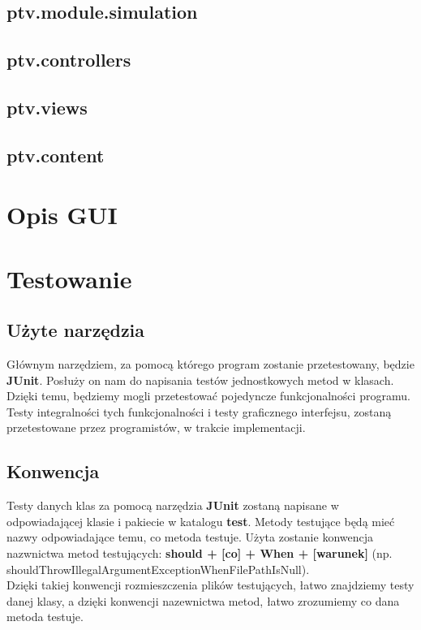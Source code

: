 \documentclass[]{article}
\begin{document}
        \subsection{ptv.module.simulation} %
        \subsection{ptv.controllers} %
        \subsection{ptv.views} %
        \subsection{ptv.content}

    
    \section{Opis GUI} %
    
    
    \section{Testowanie}
        \subsection{Użyte narzędzia}
        Głównym narzędziem, za pomocą którego program zostanie przetestowany, będzie \textbf{JUnit}.
        Posłuży on nam do napisania testów jednostkowych metod w klasach.
        Dzięki temu, będziemy mogli przetestować pojedyncze funkcjonalności programu.\\
        Testy integralności tych funkcjonalności i testy graficznego interfejsu, zostaną przetestowane przez programistów, w trakcie implementacji.
        
        \subsection{Konwencja}
        Testy danych klas za pomocą narzędzia \textbf{JUnit} zostaną napisane w odpowiadającej klasie i pakiecie
        w katalogu \textbf{test}.
        Metody testujące będą mieć nazwy odpowiadające temu, co metoda testuje.
        Użyta zostanie konwencja nazwnictwa metod testujących: \textbf{should + [co] + When + [warunek]}
        (np. shouldThrowIllegalArgumentExceptionWhenFilePathIsNull).\\
        Dzięki takiej konwencji rozmieszczenia plików testujących, łatwo znajdziemy testy danej klasy,
        a dzięki konwencji nazewnictwa metod, łatwo zrozumiemy co dana metoda testuje.
        
\end{document}
